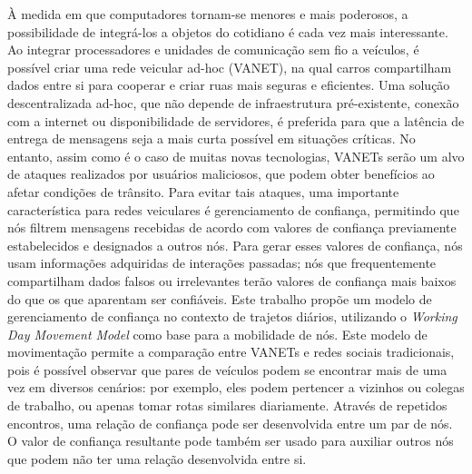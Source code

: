 \begin{resumo}



À medida em que computadores tornam-se menores e mais poderosos, a possibilidade de integrá-los a objetos do cotidiano é cada vez mais interessante.
Ao integrar processadores e unidades de comunicação sem fio a veículos, é possível criar uma rede veicular ad-hoc (VANET), na qual carros compartilham dados entre si para cooperar e criar ruas mais seguras e eficientes.
Uma solução descentralizada ad-hoc, que não depende de infraestrutura pré-existente, conexão com a internet ou disponibilidade de servidores, é preferida para que a latência de entrega de mensagens seja a mais curta possível em situações críticas.
No entanto, assim como é o caso de muitas novas tecnologias, VANETs serão um alvo de ataques realizados por usuários maliciosos, que podem obter benefícios ao afetar condições de trânsito.
Para evitar tais ataques, uma importante característica para redes veiculares é gerenciamento de confiança, permitindo que nós filtrem mensagens recebidas de acordo com valores de confiança previamente estabelecidos e designados a outros nós.
Para gerar esses valores de confiança, nós usam informações adquiridas de interações passadas; nós que frequentemente compartilham dados falsos ou irrelevantes terão valores de confiança mais baixos do que os que aparentam ser confiáveis.
Este trabalho propõe um modelo de gerenciamento de confiança no contexto de trajetos diários, utilizando o \textit{Working Day Movement Model} como base para a mobilidade de nós.
Este modelo de movimentação permite a comparação entre VANETs e redes sociais tradicionais, pois é possível observar que pares de veículos podem se encontrar mais de uma vez em diversos cenários: por exemplo, eles podem pertencer a vizinhos ou colegas de trabalho, ou apenas tomar rotas similares diariamente.
Através de repetidos encontros, uma relação de confiança pode ser desenvolvida entre um par de nós.
O valor de confiança resultante pode também ser usado para auxiliar outros nós que podem não ter uma relação desenvolvida entre si.

\end{resumo}
